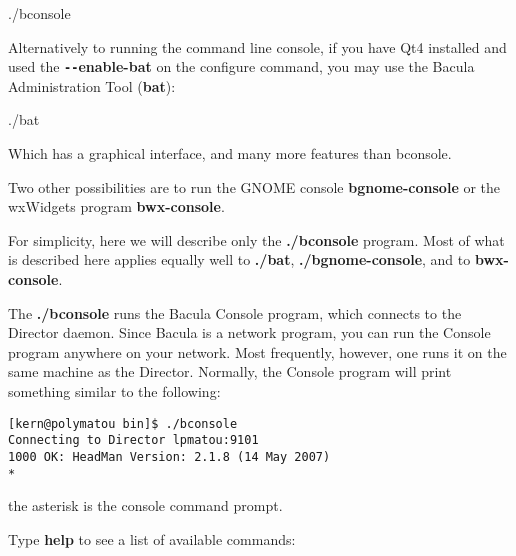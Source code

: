 ./bconsole 

Alternatively to running the command line console, if you have
Qt4 installed and used the {\bf \verb:--:enable-bat} on the configure command,
you may use the Bacula Administration Tool ({\bf bat}):

./bat

Which has a graphical interface, and many more features than bconsole.

Two other possibilities are to run the GNOME console 
{\bf bgnome-console} or the wxWidgets program {\bf bwx-console}.

For simplicity, here we will describe only the {\bf ./bconsole} program. Most
of what is described here applies equally well to {\bf ./bat},
{\bf ./bgnome-console}, and to {\bf bwx-console}.

The {\bf ./bconsole} runs the Bacula Console program, which connects to the
Director daemon. Since Bacula is a network program, you can run the Console
program anywhere on your network. Most frequently, however, one runs it on the
same machine as the Director. Normally, the Console program will print
something similar to the following: 

\footnotesize
\begin{verbatim}
[kern@polymatou bin]$ ./bconsole
Connecting to Director lpmatou:9101
1000 OK: HeadMan Version: 2.1.8 (14 May 2007)
*
\end{verbatim}
\normalsize

the asterisk is the console command prompt. 

Type {\bf help} to see a list of available commands: 

